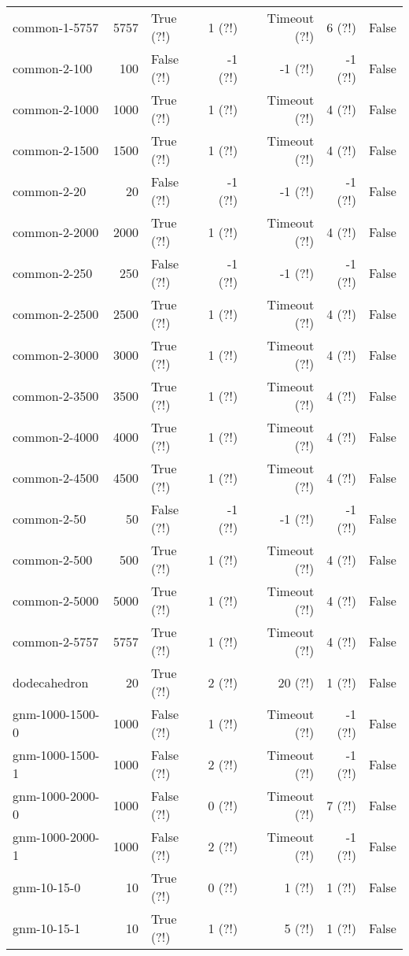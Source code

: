 \begin{longtable}{lrlrrrl}
common-1-5757 & 5757 & True (?!) & 1 (?!) & Timeout (?!) & 6 (?!) & False \\
common-2-100 & 100 & False (?!) & -1 (?!) & -1 (?!) & -1 (?!) & False \\
common-2-1000 & 1000 & True (?!) & 1 (?!) & Timeout (?!) & 4 (?!) & False \\
common-2-1500 & 1500 & True (?!) & 1 (?!) & Timeout (?!) & 4 (?!) & False \\
common-2-20 & 20 & False (?!) & -1 (?!) & -1 (?!) & -1 (?!) & False \\
common-2-2000 & 2000 & True (?!) & 1 (?!) & Timeout (?!) & 4 (?!) & False \\
common-2-250 & 250 & False (?!) & -1 (?!) & -1 (?!) & -1 (?!) & False \\
common-2-2500 & 2500 & True (?!) & 1 (?!) & Timeout (?!) & 4 (?!) & False \\
common-2-3000 & 3000 & True (?!) & 1 (?!) & Timeout (?!) & 4 (?!) & False \\
common-2-3500 & 3500 & True (?!) & 1 (?!) & Timeout (?!) & 4 (?!) & False \\
common-2-4000 & 4000 & True (?!) & 1 (?!) & Timeout (?!) & 4 (?!) & False \\
common-2-4500 & 4500 & True (?!) & 1 (?!) & Timeout (?!) & 4 (?!) & False \\
common-2-50 & 50 & False (?!) & -1 (?!) & -1 (?!) & -1 (?!) & False \\
common-2-500 & 500 & True (?!) & 1 (?!) & Timeout (?!) & 4 (?!) & False \\
common-2-5000 & 5000 & True (?!) & 1 (?!) & Timeout (?!) & 4 (?!) & False \\
common-2-5757 & 5757 & True (?!) & 1 (?!) & Timeout (?!) & 4 (?!) & False \\
dodecahedron & 20 & True (?!) & 2 (?!) & 20 (?!) & 1 (?!) & False \\
gnm-1000-1500-0 & 1000 & False (?!) & 1 (?!) & Timeout (?!) & -1 (?!) & False \\
gnm-1000-1500-1 & 1000 & False (?!) & 2 (?!) & Timeout (?!) & -1 (?!) & False \\
gnm-1000-2000-0 & 1000 & False (?!) & 0 (?!) & Timeout (?!) & 7 (?!) & False \\
gnm-1000-2000-1 & 1000 & False (?!) & 2 (?!) & Timeout (?!) & -1 (?!) & False \\
gnm-10-15-0 & 10 & True (?!) & 0 (?!) & 1 (?!) & 1 (?!) & False \\
gnm-10-15-1 & 10 & True (?!) & 1 (?!) & 5 (?!) & 1 (?!) & False \\

\end{longtable}
